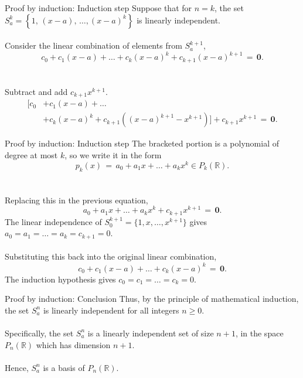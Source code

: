 \documentclass[handout]{beamer}
\begin{document}
        \begin{frame}{Proof by induction: Induction step}
                Suppose that for $n = k$, the set $S_a^k = \left\{1,\, (x - a),\, \dots, (x - a)^k\right\}$ is linearly independent. \\~\\
                \pause
                Consider the linear combination of elements from $S_a^{k + 1}$,
                \[
                        c_0 + c_1(x - a) + \dots + c_k(x - a)^k + c_{k + 1}(x - a)^{k + 1} \,=\, \mathbf{0}.
                \]\\~\\
                \pause Subtract and add $c_{k + 1}x^{k + 1}$.
                \begin{align*}
                        \Big[c_0 &+ c_1(x - a) + \dots  \\
                        &+ c_k(x - a)^k + c_{k + 1}\left((x - a)^{k + 1} - x^{k + 1}\right)\Big] + c_{k + 1}x^{k + 1} \,=\, \mathbf{0}.
                \end{align*}
        \end{frame}

        \begin{frame}{Proof by induction: Induction step}
                The bracketed portion is a polynomial of degree at most $k$, so we write it in the form
                \[
                        p_k(x) \,=\, a_0 + a_1x + \dots + a_kx^k \in P_k(\mathbb{R}).
                \]\\~\\
                \pause
                Replacing this in the previous equation,
                \[
                        a_0 + a_1x + \dots + a_kx^k + c_{k + 1}x^{k + 1} \,=\, \mathbf{0}.
                \]
                The linear independence of $S_0^{k + 1} = \{1, x, \dots, x^{k + 1}\}$ gives $a_0 = a_1 = \dots = a_k = c_{k + 1} = 0$. \\~\\
                \pause
                Substituting this back into the original linear combination,
                \[
                        c_0 + c_1(x - a) + \dots + c_k(x - a)^k \,=\, \mathbf{0}.
                \]
                The induction hypothesis gives $c_0 = c_1 = \dots = c_k = 0$.
        \end{frame}

        \begin{frame}{Proof by induction: Conclusion}
                Thus, by the principle of mathematical induction, the set $S_a^n$ is linearly independent for all integers $n \geq 0$. \\~\\

                Specifically, the set $S_a^n$ is a linearly independent set of size $n + 1$, in the space $P_n(\mathbb{R})$ which has dimension
                $n + 1$. \\~\\

                Hence, $S_a^n$ is a basis of $P_n(\mathbb{R})$.
        \end{frame}
\end{document}

